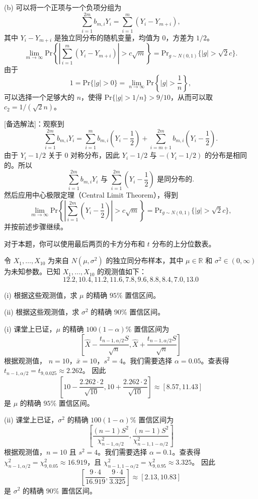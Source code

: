 \begin{questions}
\begin{solution}
(b) 可以将一个正项与一个负项分组为
\[
\sum_{i=1}^{2m} b_{m,i} Y_i = \sum_{i=1}^{m} (Y_i - Y_{m+i}),
\]
其中 $Y_i - Y_{m+i}$ 是独立同分布的随机变量，均值为 $0$，方差为 $1/2$。
\[
\lim_{m \to \infty} \text{Pr} \left\{ \left| \sum_{i=1}^{m} (Y_i - Y_{m+i}) \right| > c \sqrt{m} \right\} = \text{Pr}_{g \sim N(0,1)} \{ |g| > \sqrt{2}c \}.
\]
由于
\[
1 = \text{Pr} \{ |g| > 0 \} = \lim_{n \to \infty} \text{Pr} \left\{ |g| > \frac{1}{n} \right\},
\]
可以选择一个足够大的 $n$，使得 $\text{Pr} \{ |g| > 1/n \} > 9/10$，从而可以取 $c_2 = 1/(\sqrt{2}n)$。

[备选解法]：观察到
\[
\sum_{i=1}^{2m} b_{m,i} Y_i = \sum_{i=1}^{m} b_{m,i} \left( Y_i - \frac{1}{2} \right) + \sum_{i=m+1}^{2m} b_{m,i} \left( Y_i - \frac{1}{2} \right).
\]
由于 $Y_i - 1/2$ 关于 $0$ 对称分布，因此 $Y_i - 1/2$ 与 $-(Y_i - 1/2)$ 的分布是相同的。所以
\[
\sum_{i=1}^{2m} b_{m,i} Y_i \text{ 与 } \sum_{i=1}^{2m} \left( Y_i - \frac{1}{2} \right) \text{ 是同分布的}.
\]
然后应用中心极限定理（Central Limit Theorem），得到
\[
\lim_{m \to \infty} \text{Pr} \left\{ \left| \sum_{i=1}^{2m} \left( Y_i - \frac{1}{2} \right) \right| > c \sqrt{m} \right\} = \text{Pr}_{g \sim N(0,1)} \{ |g| > \sqrt{2}c \},
\]
并按前述步骤继续。
\end{solution}

\question
对于本题，你可以使用最后两页的卡方分布和 $t$ 分布的上分位数表。

令 $X_1, \dots, X_{10}$ 为来自 $N(\mu, \sigma^2)$ 的独立同分布样本，其中 $\mu \in \mathbb{R}$ 和 $\sigma^2 \in (0, \infty)$ 为未知参数。已知 $X_1, \dots, X_{10}$ 的观测值如下：
\[
12.2, 10.4, 11.2, 11.6, 7.8, 9.6, 8.8, 8.4, 7.0, 13.0
\]

(i) 根据这些观测值，求 $\mu$ 的精确 $95\%$ 置信区间。

(ii) 根据这些观测值，求 $\sigma^2$ 的精确 $90\%$ 置信区间。

\begin{solution}
(i) 课堂上已证，$\mu$ 的精确 $100(1 - \alpha)\%$ 置信区间为
\[
\left[ \hat{X} - \frac{t_{n-1, \alpha/2} S}{\sqrt{n}}, \hat{X} + \frac{t_{n-1, \alpha/2} S}{\sqrt{n}} \right]
\]
根据观测值， $n = 10$，$\bar{x} = 10$，$s^2 = 4$。我们需要选择 $\alpha = 0.05$。查表得 $t_{n-1, \alpha/2} = t_{9, 0.025} \approx 2.262$。
因此
\[
\left[ 10 - \frac{2.262 \cdot 2}{\sqrt{10}}, 10 + \frac{2.262 \cdot 2}{\sqrt{10}} \right] \approx [8.57, 11.43]
\]
是 $\mu$ 的精确 $95\%$ 置信区间。

(ii) 课堂上已证，$\sigma^2$ 的精确 $100(1 - \alpha)\%$ 置信区间为
\[
\left[ \frac{(n - 1) S^2}{\chi^2_{n-1, \alpha/2}}, \frac{(n - 1) S^2}{\chi^2_{n-1, 1-\alpha/2}} \right]
\]
根据观测值，$n = 10$ 且 $s^2 = 4$。我们需要选择 $\alpha = 0.1$。查表得 $\chi^2_{n-1, \alpha/2} = \chi^2_{9, 0.05} \approx 16.919$，且 $\chi^2_{n-1, 1-\alpha/2} = \chi^2_{9, 0.95} \approx 3.325$。
因此
\[
\left[ \frac{9 \cdot 4}{16.919}, \frac{9 \cdot 4}{3.325} \right] \approx [2.13, 10.83]
\]
是 $\sigma^2$ 的精确 $90\%$ 置信区间。
\end{solution}


\end{questions}
